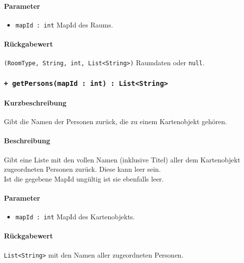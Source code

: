 \paragraph*{Parameter}
\begin{itemize}
    \item \texttt{mapId : int} MapId des Raums.
\end{itemize}
\paragraph*{Rückgabewert}
\texttt{(RoomType, String, int, List<String>)} Raumdaten oder \texttt{null}.

\subsubsection*{\texttt{+ getPersons(mapId : int) : List<String>}}%
\paragraph*{Kurzbeschreibung}
Gibt die Namen der Personen zurück, die zu einem Kartenobjekt gehören.
\paragraph*{Beschreibung}
Gibt eine Liste mit den vollen Namen (inklusive Titel) aller dem Kartenobjekt zugeordneten 
Personen zurück. Diese kann leer sein.\\
Ist die gegebene MapId ungültig ist sie ebenfalls leer.
\paragraph*{Parameter}
\begin{itemize}
    \item \texttt{mapId : int} MapId des Kartenobjekts.
\end{itemize}
\paragraph*{Rückgabewert}
\texttt{List<String>} mit den Namen aller zugeordneten Personen.

